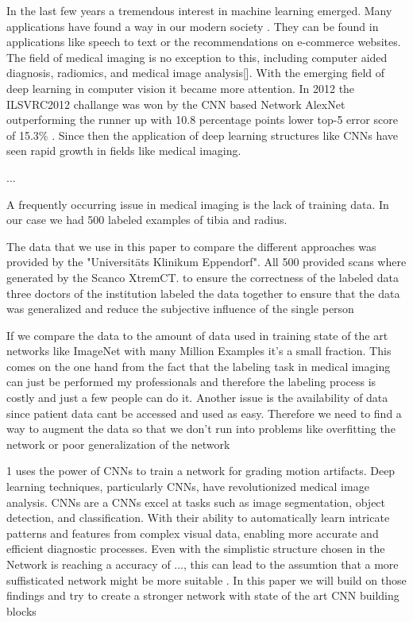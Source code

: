 \documentclass[
a4paper, 
12pt,
grayscalebody, %
abstract=on,
twoside, BCOR10mm, 12pt, DIV13,headinclude, footexclude, final, abstracton, openright
]{ibireprt}
\numberwithin{equation}{chapter}
\numberwithin{table}{chapter}
\numberwithin{figure}{chapter}
\numberwithin{algorithm}{chapter}
\numberwithin{example}{chapter}
\numberwithin{example}{chapter}
\begin{document}
In the last few years a tremendous interest in machine learning emerged. Many applications have found a way in our modern society \cite{LeCun2015}. They can be found in applications like speech to text or the recommendations on e-commerce websites. The field of medical imaging is no exception to this, including computer aided diagnosis, radiomics, and medical image analysis[]. With the emerging field of deep learning in computer vision it became more attention. In 2012 the ILSVRC2012 challange  was won by the CNN based Network AlexNet outperforming the runner up with 10.8 percentage points lower top-5 error score of 15.3\% . Since then the application of deep learning structures like CNNs have seen rapid growth in fields like medical imaging. 

 ...\cite{Yamashita2018} %

A frequently occurring issue in medical imaging is the lack of training data. In our case we had 500 labeled examples of tibia and radius.

The data that we use in this paper to compare the different approaches was provided by the "Universitäts Klinikum Eppendorf". All 500 provided scans where generated by the Scanco XtremCT.%
to ensure the correctness of the labeled data three doctors of the institution labeled the data together to ensure that the data was generalized and reduce the subjective influence of the single person  

 If we compare the data to the amount of data used in training state of the art networks like ImageNet with many Million Examples it's a small fraction. This comes on the one hand from the fact that the labeling task in medical imaging can just be performed my professionals and therefore the labeling process is costly and just a few people can do it. Another issue is the availability of data since patient data cant be accessed and used as easy. Therefore we need to find a way to augment the data so that we don't run into problems like overfitting the network or poor generalization of the network 
  

1\cite{Sode2011} uses the power of CNNs to train a network for grading motion artifacts. Deep learning techniques, particularly CNNs, have revolutionized medical image analysis. CNNs are a %
CNNs excel at tasks such as image segmentation, object detection, and classification. With their ability to automatically learn intricate patterns and features from complex visual data, enabling more accurate and efficient diagnostic processes. %
Even with the simplistic structure chosen in \cite{Sode2011} the Network is reaching a accuracy of ..., this can lead to the assumtion that a more suffisticated network might be more suitable . In this paper we will build on those findings and try to create a stronger network with state of the art CNN building blocks 
\end{document}

